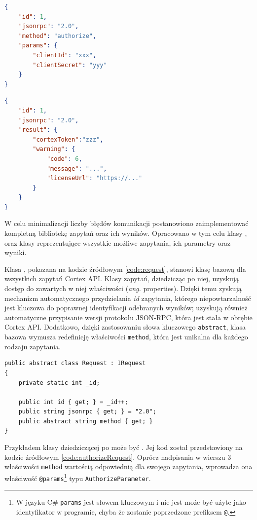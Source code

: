 \documentclass[skorowidz,skroty]{dyplomWEZUT}
\begin{document}
\begin{lstlisting}[language=json]
{
    "id": 1,
    "jsonrpc": "2.0",
    "method": "authorize",
    "params": {
        "clientId": "xxx",
        "clientSecret": "yyy"
    }
}
\end{lstlisting}

\begin{lstlisting}[language=json]
{
    "id": 1,
    "jsonrpc": "2.0",
    "result": {
        "cortexToken":"zzz",
        "warning": {
            "code": 6,
            "message": "...",
            "licenseUrl": "https://..."
        }
    }
}
\end{lstlisting}

W celu minimalizacji liczby błędów komunikacji postanowiono zaimplementować kompletną bibliotekę zapytań oraz ich wyników. Opracowano w tym celu klasy ,  oraz klasy reprezentujące wszystkie możliwe zapytania, ich parametry oraz wyniki. 

Klasa , pokazana na kodzie źródłowym \ref{code:request}, stanowi klasę bazową dla wszystkich zapytań Cortex API. Klasy zapytań, dziedzicząc po niej, uzyskują dostęp do zawartych w niej właściwości (\textit{ang.} properties). Dzięki temu zyskują mechanizm automatycznego przydzielania \textit{id} zapytania, którego niepowtarzalność jest kluczowa do poprawnej identyfikacji odebranych wyników; uzyskują również automatyczne przypisanie wersji protokołu JSON-RPC, która jest stała w obrębie Cortex API. Dodatkowo, dzięki zastosowaniu słowa kluczowego \lstinline[language=C]{abstract}, klasa bazowa wymusza redefinicję właściwości \lstinline[language={[Sharp]C}]{method}, która jest unikalna dla każdego rodzaju zapytania.

\begin{lstlisting}[language={[Sharp]C}]
public abstract class Request : IRequest
{
    private static int _id;

    public int id { get; } = _id++;
    public string jsonrpc { get; } = "2.0";
    public abstract string method { get; }
}
\end{lstlisting}

Przykładem klasy dziedziczącej po  może być . Jej kod został przedstawiony na kodzie źródłowym \ref{code:authorizeRequest}. Oprócz nadpisania w wierszu 3 właściwości \lstinline[language={[Sharp]C}]{method} wartością odpowiednią dla swojego zapytania, wprowadza ona właściwość \lstinline[language={[Sharp]C}]{@params}\footnote{W języku C\# \lstinline[language={[Sharp]C}]{params} jest słowem kluczowym i nie jest może być użyte jako identyfikator w programie, chyba że zostanie poprzedzone prefiksem \lstinline[language={[Sharp]C}]{@}.} typu \lstinline[language={[Sharp]C}]{AuthorizeParameter}. 
\end{document}
